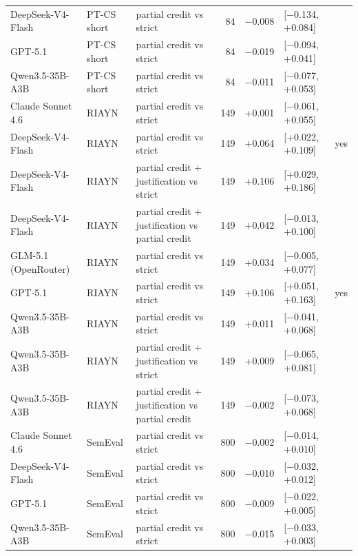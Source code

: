 \documentclass[10pt]{article}
\begin{document}
\begin{longtable}{ll>{\raggedright\arraybackslash}p{4.2cm}rrlc}
DeepSeek-V4-Flash & PT-CS short & partial credit vs strict & 84 & $-$0.008 & [$-$0.134, +0.084] &  \\
GPT-5.1 & PT-CS short & partial credit vs strict & 84 & $-$0.019 & [$-$0.094, +0.041] &  \\
Qwen3.5-35B-A3B & PT-CS short & partial credit vs strict & 84 & $-$0.011 & [$-$0.077, +0.053] &  \\
Claude Sonnet 4.6 & RIAYN & partial credit vs strict & 149 & +0.001 & [$-$0.061, +0.055] &  \\
DeepSeek-V4-Flash & RIAYN & partial credit vs strict & 149 & +0.064 & [+0.022, +0.109] & yes \\
DeepSeek-V4-Flash & RIAYN & partial credit + justification vs strict & 149 & +0.106 & [+0.029, +0.186] &  \\
DeepSeek-V4-Flash & RIAYN & partial credit + justification vs partial credit & 149 & +0.042 & [$-$0.013, +0.100] &  \\
GLM-5.1 (OpenRouter) & RIAYN & partial credit vs strict & 149 & +0.034 & [$-$0.005, +0.077] &  \\
GPT-5.1 & RIAYN & partial credit vs strict & 149 & +0.106 & [+0.051, +0.163] & yes \\
Qwen3.5-35B-A3B & RIAYN & partial credit vs strict & 149 & +0.011 & [$-$0.041, +0.068] &  \\
Qwen3.5-35B-A3B & RIAYN & partial credit + justification vs strict & 149 & +0.009 & [$-$0.065, +0.081] &  \\
Qwen3.5-35B-A3B & RIAYN & partial credit + justification vs partial credit & 149 & $-$0.002 & [$-$0.073, +0.068] &  \\
Claude Sonnet 4.6 & SemEval & partial credit vs strict & 800 & $-$0.002 & [$-$0.014, +0.010] &  \\
DeepSeek-V4-Flash & SemEval & partial credit vs strict & 800 & $-$0.010 & [$-$0.032, +0.012] &  \\
GPT-5.1 & SemEval & partial credit vs strict & 800 & $-$0.009 & [$-$0.022, +0.005] &  \\
Qwen3.5-35B-A3B & SemEval & partial credit vs strict & 800 & $-$0.015 & [$-$0.033, +0.003] &  \\
\hline
\end{longtable}
\endgroup
\end{document}
